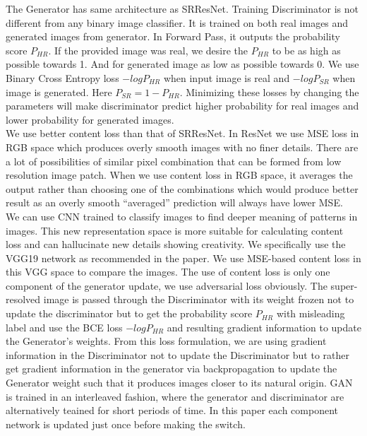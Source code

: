 \begin{enumerate}
    The Generator has same architecture as SRResNet. Training Discriminator is not different from any binary image classifier. It is trained on both real images and generated images from generator. In Forward Pass, it outputs the probability score $P_{HR}$. If the provided image was real, we desire the $P_{HR}$ to be as high as possible towards 1. And for generated image as low as possible towards 0. We use Binary Cross Entropy loss $-logP_{HR}$ when input image is real and $-logP_{SR}$ when image is generated. Here $P_{SR}=1-P_{HR}$. Minimizing these losses by changing the parameters will make discriminator predict higher probability for real images and lower probability for generated images.\\
    We use better content loss than that of SRResNet. In ResNet we use MSE loss in RGB space which produces overly smooth images with no finer details. There are a lot of possibilities of similar pixel combination that can be formed from low resolution image patch. When we use content loss in RGB space, it averages the output rather than choosing one of the combinations which would produce better result as an overly smooth “averaged” prediction will always have lower MSE.\\
    We can use CNN trained to classify images to find deeper meaning of patterns in images. This new representation space is more suitable for calculating content loss and can hallucinate new details showing creativity. We specifically use the VGG19 network as recommended in the paper. We use MSE-based content loss in this VGG space to compare the images. The use of content loss is only one component of the generator update, we use adversarial loss obviously. The super-resolved image is passed through the Discriminator with its weight frozen not to update the discriminator but to get the probability score $P_{HR}$ with misleading label and use the BCE loss $-logP_{HR}$ and resulting gradient information to update the Generator’s weights. From this loss formulation, we are using gradient information in the Discriminator not to update the Discriminator but to rather get gradient information in the generator via backpropagation to update the Generator weight such that it produces images closer to its natural origin.
    GAN is trained in an interleaved fashion, where the generator and discriminator are alternatively teained for short periods of time. In this paper each component network is updated just once before making the switch. 

    \end{enumerate}
